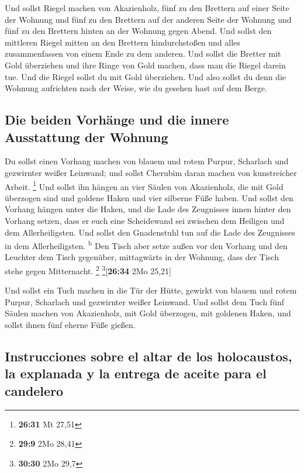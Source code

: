  Und sollst Riegel machen von Akazienholz, fünf zu den
Brettern auf einer Seite der Wohnung  und fünf zu den
Brettern auf der anderen Seite der Wohnung und fünf zu den Brettern
hinten an der Wohnung gegen Abend.  Und sollst den
mittleren Riegel mitten an den Brettern hindurchstoßen und alles
zusammenfassen von einem Ende zu dem anderen.  Und sollst
die Bretter mit Gold überziehen und ihre Ringe von Gold machen, dass man
die Riegel darein tue.  Und die Riegel sollst du mit Gold
überziehen. Und also sollst du denn die Wohnung aufrichten nach der
Weise, wie du gesehen hast auf dem Berge.

\hypertarget{die-beiden-vorhuxe4nge-und-die-innere-ausstattung-der-wohnung}{%
\subsection{Die beiden Vorhänge und die innere Ausstattung der
Wohnung}\label{die-beiden-vorhuxe4nge-und-die-innere-ausstattung-der-wohnung}}

 Du sollst einen Vorhang machen von blauem und rotem
Purpur, Scharlach und gezwirnter weißer Leinwand; und sollst Cherubim
daran machen von kunstreicher Arbeit. \footnote{\textbf{26:31} Mt 27,51}
 Und sollst ihn hängen an vier Säulen von Akazienholz,
die mit Gold überzogen sind und goldene Haken und vier silberne Füße
haben.  Und sollst den Vorhang hängen unter die Haken,
und die Lade des Zeugnisses innen hinter den Vorhang setzen, dass er
euch eine Scheidewand sei zwischen dem Heiligen und dem Allerheiligsten.
 Und sollst den Gnadenstuhl tun auf die Lade des
Zeugnisses in dem Allerheiligsten. \textsuperscript{b} 
Den Tisch aber setze außen vor den Vorhang und den Leuchter dem Tisch
gegenüber, mittagwärts in der Wohnung, dass der Tisch stehe gegen
Mitternacht. \footnote{\textbf{29:9} 2Mo 28,41}
\footnote{\textbf{30:30} 2Mo 29,7}{[}\textbf{26:34} 2Mo 25,21{]}

 Und sollst ein Tuch machen in die Tür der Hütte, gewirkt
von blauem und rotem Purpur, Scharlach und gezwirnter weißer Leinwand.
 Und sollst dem Tuch fünf Säulen machen von Akazienholz,
mit Gold überzogen, mit goldenen Haken, und sollst ihnen fünf eherne
Füße gießen.

\hypertarget{instrucciones-sobre-el-altar-de-los-holocaustos-la-explanada-y-la-entrega-de-aceite-para-el-candelero}{%
\subsection{Instrucciones sobre el altar de los holocaustos, la
explanada y la entrega de aceite para el
candelero}\label{instrucciones-sobre-el-altar-de-los-holocaustos-la-explanada-y-la-entrega-de-aceite-para-el-candelero}}

